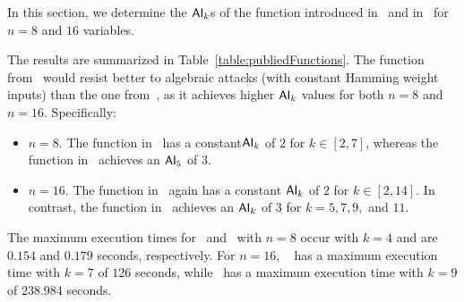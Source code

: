 \documentclass[11pt]{llncs}
\begin{document}
In this section, we determine the $\mathsf{AI}_{k}$s of the function introduced in~\cite{Mat:ZJZQ23} and in~\cite{AMC:DalMal23} for $n=8$ and $16$ variables.


The results are summarized in Table~\ref{table:publiedFunctions}. 
The function from~\cite{AMC:DalMal23} would resist better to algebraic attacks (with constant Hamming weight inputs) than the one from~\cite{Mat:ZJZQ23}, as it achieves higher $\mathsf{AI}_{k}$ values for both $n = 8$ and $ n = 16$. Specifically:
\begin{itemize}
\item $n=8$. 
The function in~\cite{Mat:ZJZQ23} has a constant$\mathsf{AI}_{k}$ of $2$ for $k \in [2, 7]$, whereas the function in~\cite{AMC:DalMal23} achieves an $\mathsf{AI}_{5}$ of $3$.

\item $n=16$. 
The function in~\cite{Mat:ZJZQ23} again has a constant $\mathsf{AI}_{k}$ of $2$ for $k \in [2, 14]$. 
In contrast, the function in~\cite{AMC:DalMal23} achieves an $\mathsf{AI}_{k}$ of $3$ for $k = 5, 7, 9,$ and $11$.
\end{itemize}


The maximum execution times for~\cite{AMC:DalMal23} and~\cite{Mat:ZJZQ23} with $n=8$ occur with $k=4$ and are $0.154$ and $0.179$ seconds, respectively. For $n=16$, ~\cite{AMC:DalMal23} has a maximum execution time with $k=7$ of $126$ seconds, while~\cite{Mat:ZJZQ23} has a maximum execution time with $k=9$ of $238.984$ seconds. 
\end{document}
